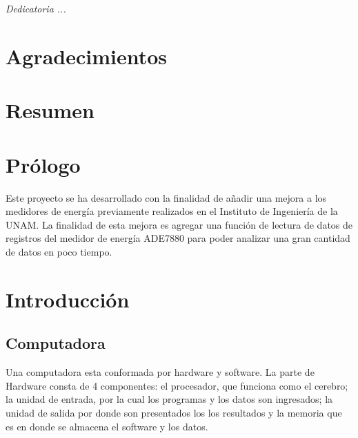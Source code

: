 \documentclass[letterpaper,12pt,oneside]{book}
\author{Luis Esteban Serrano Bermúdez}
\title{}
\begin{document}
	\frontmatter
	\maketitle
	\chapter*{}

	\begin{flushright}
	  \emph{Dedicatoria ...} 
	  \thispagestyle{empty}
	\end{flushright}

	\chapter{Agradecimientos}

	\chapter{Resumen}

	\tableofcontents
	\listoffigures
	\listoftables

	\chapter{Prólogo}
    Este proyecto se ha desarrollado con la finalidad de añadir una mejora a los medidores de energía previamente realizados en el Instituto de Ingeniería de la UNAM. La finalidad de esta mejora es agregar una función de lectura de datos de registros del medidor de energía ADE7880 para poder analizar una gran cantidad de datos en poco tiempo.

	\mainmatter

	\chapter{Introducción}
		\section{Computadora}
		Una computadora esta conformada por hardware y software. La parte de Hardware consta de 4 componentes: el procesador, que funciona como el cerebro; la unidad de entrada, por la cual los programas y los datos son ingresados; la unidad de salida por donde son presentados los los resultados y la memoria que es en donde se almacena el software y los datos.
\end{document}

